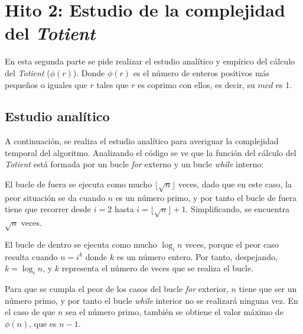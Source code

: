 \documentclass{uc3mpracticas}
\begin{document}
  \frontmatter



  \vspace{55mm}


  \newpage

  \tableofcontents

  \newpage

  \mainmatter

  \section{Hito 2: Estudio de la complejidad del \textit{Totient}}

  En esta segunda parte se pide realizar el estudio analítico y empírico del cálculo del \textit{Totient} ($\phi(r)$). Donde $\phi(r)$ es el número de enteros positivos más pequeños o iguales que $r$ tales que $r$ es coprimo con ellos, es decir, su $mcd$ es 1.



  \subsection{Estudio analítico}

  A continuación, se realiza el estudio analítico para averiguar la complejidad temporal del algoritmo. Analizando el código se ve que la función del cálculo del \textit{Totient} está formada por un bucle \textit{for} externo y un bucle \textit{while} interno:

  \vspace{2mm}

  El bucle de fuera se ejecuta como mucho $\lfloor \sqrt{n} \rfloor$ veces, dado que en este caso, la peor situación se da cuando $n$ es un número primo, y por tanto el bucle de fuera tiene que recorrer desde $i = 2$ hasta $i = \lfloor \sqrt{n} \rfloor + 1$. Simplificando, se encuentra $\sqrt{n}$ veces.

  \vspace{2mm}

  El bucle de dentro se ejecuta como mucho $\log_i{n}$ veces, porque el peor caso resulta cuando $ n = i^k $ donde $ k $ es un número entero. Por tanto, despejando, $k = \log_in$, y $k$ representa el número de veces que se realiza el bucle.

  \vspace{2mm}

  Para que se cumpla el peor de los casos del bucle \textit{for} exterior, $n$ tiene que ser un número primo, y por tanto el bucle \textit{while} interior no se realizará ninguna vez. En el caso de que $n$ sea el número primo, también se obtiene el valor máximo de $\phi(n)$, que es $n-1$.




%
% 
% 
\end{document}
